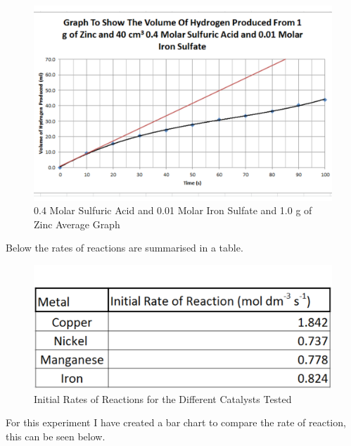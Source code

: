\begin{figure}[H]
    \includegraphics[width=\textwidth]{./Analysis/Images/4DifferentCatalysts/Iron.pdf}
    \caption{0.4 Molar Sulfuric Acid and 0.01 Molar Iron Sulfate and 1.0 g of Zinc Average Graph} \label{fig:IronGradient}
\end{figure}

Below the rates of reactions are summarised in a table.

\begin{figure}[H]
    \includegraphics[width=\textwidth]{./Analysis/Images/4DifferentCatalysts/Rates.pdf}
    \caption{Initial Rates of Reactions for the Different Catalysts Tested} \label{fig:RatesDiffCat}
\end{figure}


 For this experiment I have created a bar chart to compare the rate of reaction, this can be seen below.

